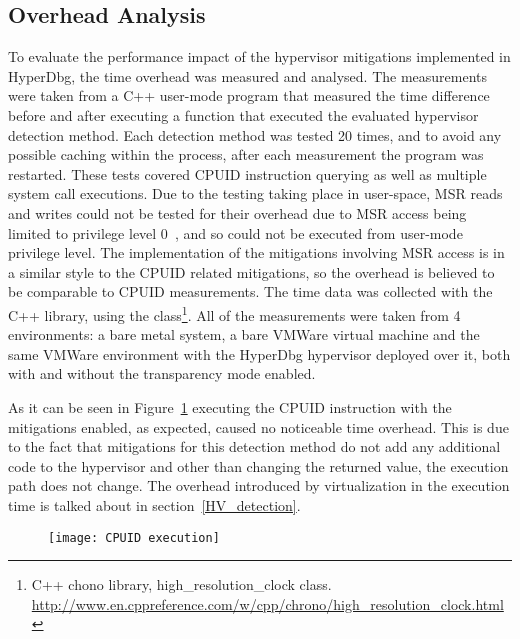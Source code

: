 \subsection{Overhead Analysis}
To evaluate the performance impact of the hypervisor mitigations implemented in HyperDbg, the time overhead was measured and analysed. 
The measurements were taken from a C++ user-mode program that measured the time difference before and after executing a function that executed the evaluated hypervisor detection method. 
Each detection method was tested 20 times, and to avoid any possible caching within the process, after each measurement the program was restarted. 
These tests covered CPUID instruction querying as well as multiple system call executions. Due to the testing taking place in user-space, 
MSR reads and writes could not be tested for their overhead due to MSR access being limited to privilege level 0~\cite[Volume 2B]{Intel-SDM2025}, and so could not be executed from user-mode privilege level.
The implementation of the mitigations involving MSR access is in a similar style to the CPUID related mitigations, so the overhead is believed to be comparable to CPUID measurements.
The time data was collected with the C++  library, 
using the  class\footnote{C++ chono library, high\_resolution\_clock class. \url{http://www.en.cppreference.com/w/cpp/chrono/high_resolution_clock.html}}.
All of the measurements were taken from 4 environments: a bare metal system, a bare VMWare virtual machine and the same 
VMWare environment with the HyperDbg hypervisor deployed over it, both with and without the transparency mode enabled.

As it can be seen in Figure~\ref{fig:cpuid_exec_time} executing the CPUID instruction with the mitigations enabled, as expected, caused no noticeable time overhead. 
This is due to the fact that mitigations for this detection method do not add any additional code to the hypervisor and other than changing the returned value, the execution path does not change.
The overhead introduced by virtualization in the execution time is talked about in section~\ref{HV_detection}.
\begin{figure}[tbh]
    \texttt{[image: CPUID execution]} %
    \label{fig:cpuid_exec_time}
\end{figure}

